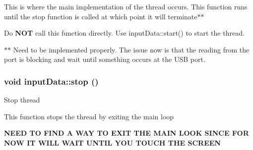 This is where the main implementation of the thread occurs. This function runs until the stop function is called at which point it will terminate$\ast$$\ast$

Do {\bfseries NOT} call this function directly. Use inputData::start() to start the thread.

$\ast$$\ast$ Need to be implemented properly. The issue now is that the reading from the port is blocking and wait until something occurs at the USB port. \hypertarget{classinputData_a438c97b6d6ccc1abe4c8adceff0decb4}{
\subsubsection[{stop}]{\setlength{\rightskip}{0pt plus 5cm}void inputData::stop ()}}
\label{classinputData_a438c97b6d6ccc1abe4c8adceff0decb4}
Stop thread

This function stops the thread by exiting the main loop

{\bfseries NEED TO FIND A WAY TO EXIT THE MAIN LOOK SINCE FOR NOW IT WILL WAIT UNTIL YOU TOUCH THE SCREEN} 

